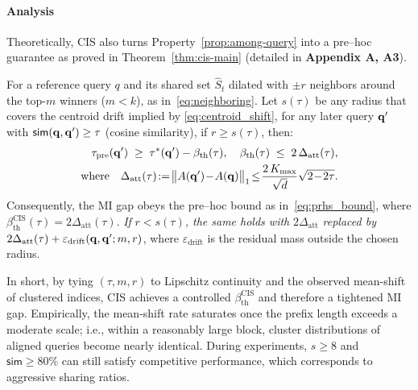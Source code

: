 \paragraph{Analysis}
\label{sec:cis_analysis}
Theoretically, CIS also turns Property~\ref{prop:among-query} into a pre–hoc guarantee as proved in Theorem~\ref{thm:cis-main} (detailed in \textbf{Appendix A, A3}). 

\begin{theorem}
\label{thm:cis-main}
For a reference query $q$ and its shared set $\hat S_t$ dilated with $\pm r$ neighbors 
around the top-$m$ winners ($m<k$), as in~\eqref{eq:neighboring}. Let $s(\tau)$ be any radius that covers the centroid drift implied by \eqref{eq:centroid_shift}, for any later query $\mathbf{q}'$ with $\mathsf{sim}(\mathbf{q},\mathbf{q}')\ge \tau$ (cosine similarity), if $r\!\ge\!s(\tau)$, then:
\begin{equation}
\begin{aligned}
\tau_{\mathrm{pre}}(\bq') \;\ge\; \tau^*(\bq') - \beta_{\mathrm{th}}(\tau),
\quad 
\beta_{\mathrm{th}}(\tau) \;\le\; 2\,\Delta_{\mathrm{att}}(\tau), \\
\text{where} \quad \Delta_{\mathrm{att}}(\tau)\!:=\!\big\|A(\bq')\!-\!A(\bq)\big\|_1 
\!\le\! \frac{2\,K_{\max}}{\sqrt d}\sqrt{2\!-\!2\tau}.
\end{aligned}
\end{equation}
Consequently, the MI gap obeys the pre–hoc bound as in~\eqref{eq:prhs_bound}, where $\beta_{\mathrm{th}}^{\mathrm{CIS}}(\tau)=2\Delta_{\mathrm{att}}(\tau)$. \emph{If }$r<s(\tau)$\emph{, the same holds with }\(2\Delta_{\mathrm{att}}\) \emph{replaced by } 
\(2\Delta_{\mathrm{att}}(\tau)+\varepsilon_{\mathrm{drift}}(\mathbf{q},\mathbf{q}';m,r)\), 
where \(\varepsilon_{\mathrm{drift}}\) is the residual mass outside the chosen radius.
\end{theorem}



In short, by tying $(\tau,m,r)$ to Lipschitz continuity and the observed mean-shift of clustered indices, CIS achieves a controlled $\beta_{\mathrm{th}}^{\mathrm{CIS}}$ and therefore a tightened MI gap. Empirically, the mean-shift rate saturates once the prefix length exceeds a moderate scale; i.e., within a reasonably large block, cluster distributions of aligned queries become nearly identical. During experiments, $s\geq 8$ and $\mathsf{sim} \geq 80\%$ can still satisfy competitive performance, which corresponds to aggressive sharing ratios.


